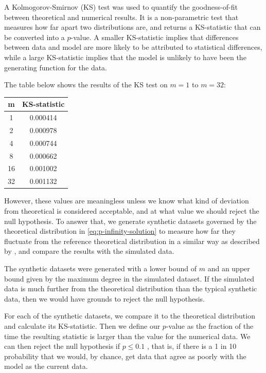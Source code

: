 A Kolmogorov-Smirnov (KS) test was used to quantify the goodness-of-fit between theoretical and numerical results. It is a non-parametric test that measures how far apart two distributions are, and returns a KS-statistic that can be converted into a $p$-value. A smaller KS-statistic implies that differences between data and model are more likely to be attributed to statistical differences, while a large KS-statistic implies that the model is unlikely to have been the generating function for the data. 

The table below shows the results of the KS test on $m = 1$ to $m=32$:

\begin{center}
\begin{tabular}{ c | c }
 m &  KS-statistic \\ 
 \hline
 1 & 0.000414 \\  
 2 & 0.000978 \\
 4 & 0.000744 \\
 8 & 0.000662 \\
 16 & 0.001002 \\
 32 & 0.001132 \\  
\end{tabular}
\label{table:ks-test}
\end{center}

However, these values are meaningless unless we know what kind of deviation from theoretical is considered acceptable, and at what value we should reject the null hypothesis. To answer that, we generate synthetic datasets governed by the theoretical distribution in \autoref{eq:p-infinity-solution} to measure how far they fluctuate from the reference theoretical distribution in a similar way as described by \citet{Clauset2009}, and compare the results with the simulated data. 

The synthetic datasets were generated with a lower bound of $m$ and an upper bound given by the maximum degree in the simulated dataset. If the simulated data is much further from the theoretical distribution than the typical synthetic data, then we would have grounds to reject the null hypothesis. 

For each of the synthetic datasets, we compare it to the theoretical distribution and calculate its KS-statistic. Then we define our $p$-value as the fraction of the time the resulting statistic is larger than the value for the numerical data. We can then reject the null hypothesis if $p \leq 0.1$ \citep{Clauset2009}, that is, if there is a 1 in 10 probability that we would, by chance, get data that agree as poorly with the model as the current data. 

